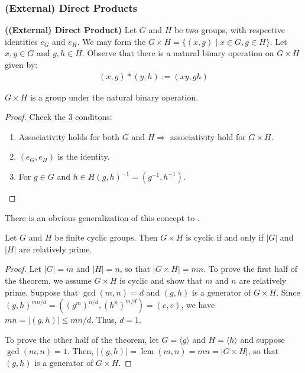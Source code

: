 \documentclass{article}
\newcommand{\bfs}[1]{\textbf{({#1}) }}
\begin{document}
\subsubsection{(External) Direct Products}
\begin{defa}{\bfs{(External) Direct Product}}
 Let $G$ and $H$ be two groups, with respective identities $e_{G}$ and $e_{H} .$ We may form the  $G \times H=\{(x, g) \mid x \in G, g \in H\} .$ Let $x, y \in G$ and $g, h \in H .$ Observe that there is a natural binary operation on $G \times H$ given by:
\begin{align*}
(x, g) *(y, h):=(x y, g h)
\end{align*}
\end{defa} 
\begin{lema}
$G \times H$ is a group under the natural binary operation.
\end{lema}
\begin{proof}Check the 3 conditons:
\begin{enumerate}
    \item Associativity holds for both $G$ and $H \Rightarrow$ associativity hold for $G \times H$.
    \item $\left(e_{G}, e_{H}\right)$ is the identity.
    \item  For $g \in G$ and $h \in H(g, h)^{-1}=\left(g^{-1}, h^{-1}\right)$.
\end{enumerate} 
\end{proof}
\begin{rema}
There is an obvious generalization of this concept to .
\end{rema}
\begin{thma}
Let $G$ and $H$ be finite cyclic groups. Then $G \times H$ is cyclic if and only if $|G|$ and $|H|$ are relatively prime.
\end{thma}
\begin{proof}
Let $|G|=m$ and $|H|=n$, so that $|G \times H|=m n$. To prove the first half of the theorem, we assume $G \times H$ is cyclic and show that $m$ and $n$ are relatively prime. Suppose that $\gcd(m, n)=d$ and $(g, h)$ is a generator of $G \times H$. Since $(g, h)^{m n / d}=\left(\left(g^{m}\right)^{n / d},\left(h^{n}\right)^{m / d}\right)=(e, e)$, we have $m n=|(g, h)| \leq m n / d$. Thus, $d=1$.

To prove the other half of the theorem, let $G=\langle g\rangle$ and $H=\langle h\rangle$ and suppose $\operatorname{gcd}(m, n)=1$. Then, $|(g, h)|=\operatorname{lcm}(m, n)=m n=|G \times H|$, so that $(g, h)$ is a generator of $G \times H$.
\end{proof}
\end{document}
